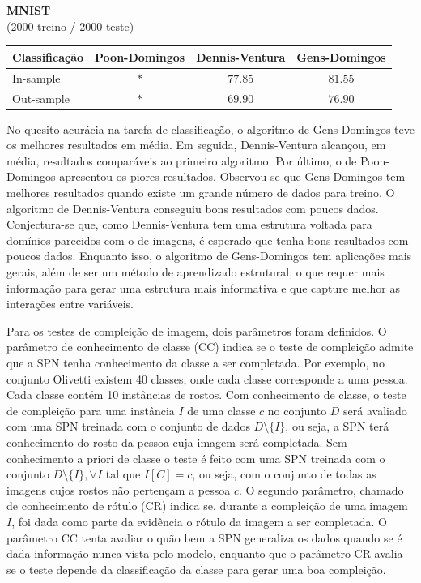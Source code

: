\documentclass[12pt]{article}
\theoremstyle{plain}
\numberwithin{equation}{section}
\begin{document}
\begin{table}[H]
\begin{tabular}{l|cccccccccc}
  \end{tabular}\\~\\
  \textbf{MNIST}\\(2000 treino / 2000 teste)\vspace{0.25cm}\\
  \begin{tabular}{l|ccc}
    Classificação & Poon-Domingos & Dennis-Ventura & Gens-Domingos \\
    \hline
    In-sample & $\ast$ & $77.85$ & $81.55$ \\
    Out-sample & $\ast$ & $69.90$ & $76.90$ \\
  \end{tabular}
\end{table}

No quesito acurácia na tarefa de classificação, o algoritmo de Gens-Domingos teve os melhores
resultados em média. Em seguida, Dennis-Ventura alcançou, em média, resultados comparáveis ao
primeiro algoritmo. Por último, o de Poon-Domingos apresentou os piores resultados. Observou-se que
Gens-Domingos tem melhores resultados quando existe um grande número de dados para treino. O
algoritmo de Dennis-Ventura conseguiu bons resultados com poucos dados. Conjectura-se que, como
Dennis-Ventura tem uma estrutura voltada para domínios parecidos com o de imagens, é esperado que
tenha bons resultados com poucos dados. Enquanto isso, o algoritmo de Gens-Domingos tem aplicações
mais gerais, além de ser um método de aprendizado estrutural, o que requer mais informação para
gerar uma estrutura mais informativa e que capture melhor as interações entre variáveis.

Para os testes de compleição de imagem, dois parâmetros foram definidos. O parâmetro de
conhecimento de classe (CC) indica se o teste de compleição admite que a SPN tenha conhecimento da
classe a ser completada. Por exemplo, no conjunto Olivetti existem 40 classes, onde cada classe
corresponde a uma pessoa. Cada classe contém 10 instâncias de rostos. Com conhecimento de classe, o
teste de compleição para uma instância $I$ de uma classe $c$ no conjunto $D$ será avaliado com uma
SPN treinada com o conjunto de dados $D\setminus\{I\}$, ou seja, a SPN terá conhecimento do rosto
da pessoa cuja imagem será completada. Sem conhecimento a priori de classe o teste é feito com uma
SPN treinada com o conjunto $D\setminus\{I\}, \forall I$ tal que $I[C]=c$, ou seja, com o conjunto
de todas as imagens cujos rostos não pertençam a pessoa $c$. O segundo parâmetro, chamado de
conhecimento de rótulo (CR) indica se, durante a compleição de uma imagem $I$, foi dada como parte
da evidência o rótulo da imagem a ser completada. O parâmetro CC tenta avaliar o quão bem a SPN
generaliza os dados quando se é dada informação nunca vista pelo modelo, enquanto que o parâmetro
CR avalia se o teste depende da classificação da classe para gerar uma boa compleição.
\end{document}
